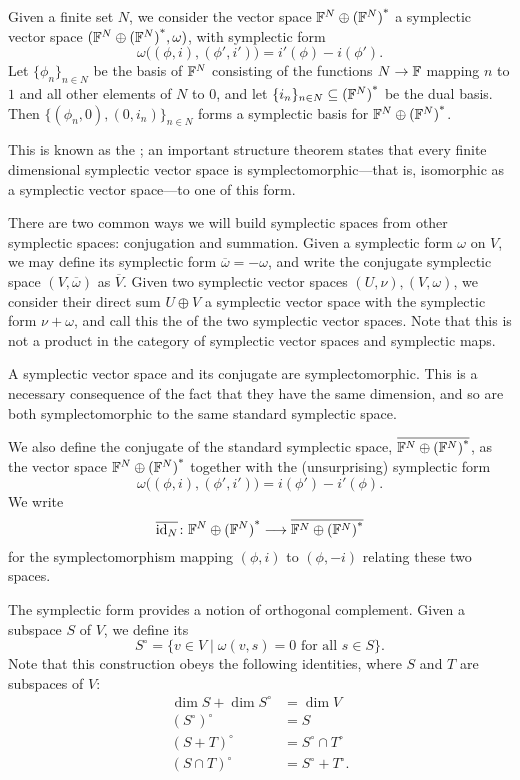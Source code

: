 \begin{example}
  \label{ex:symplectic_space_generated_by_set}
  Given a finite set $N$, we consider the vector space ${{\mathbb F}^{N} \oplus {({\mathbb F}^{N})}^\ast}$ a symplectic
  vector space $({{\mathbb F}^{N} \oplus {({\mathbb F}^{N})}^\ast},\omega)$, with symplectic form 
  \[
    \omega\big((\phi,i),(\phi',i')\big) = i'(\phi)-i(\phi').  
  \] 
  Let $\{\phi_n\}_{n \in N}$ be the basis of ${\mathbb F}^N$ consisting of the functions
  $N \to {\mathbb F}$ mapping $n$ to $1$ and all other elements of $N$ to $0$, and let
  $\{i_n\}_{n \in N} \subseteq {({\mathbb F}^N)}^\ast$ be the dual basis. Then
  $\{(\phi_n,0),(0,i_n)\}_{n\in N}$ forms a symplectic basis for ${{\mathbb F}^{N} \oplus {({\mathbb F}^{N})}^\ast}$.  

  This is known as the ; an important
  structure theorem states that every finite dimensional symplectic vector space
  is symplectomorphic---that is, isomorphic as a symplectic vector space---to
  one of this form. 
\end{example}

There are two common ways we will build symplectic spaces from other symplectic
spaces: conjugation and summation. Given a symplectic form $\omega$ on $V$, we
may define its  symplectic form $\overline\omega = - \omega$,
and write the conjugate symplectic space $(V,\overline\omega)$ as $\overline V$.
Given two symplectic vector spaces $(U, \nu),(V,\omega)$, we consider their
direct sum $U \oplus V$ a symplectic vector space with the symplectic form
$\nu+\omega$, and call this the  of the two symplectic vector
spaces. Note that this is not a product in the category of symplectic vector
spaces and symplectic maps.

\begin{example}
  \label{ex:symplectomorphisms}
  A symplectic vector space and its conjugate are symplectomorphic. This is a
  necessary consequence of the fact that they have the same dimension, and so
  are both symplectomorphic to the same standard symplectic space. 
  
  We also define the conjugate of the standard symplectic space,
  $\overline{{{\mathbb F}^{N} \oplus {({\mathbb F}^{N})}^\ast}}$, as the vector space ${{\mathbb F}^{N} \oplus {({\mathbb F}^{N})}^\ast}$ together with the
  (unsurprising) symplectic form
  \[
    \omega\big((\phi,i),(\phi',i')\big) = i(\phi')-i'(\phi).  
  \] 
  We write 
  \[
    \overline{\mathrm{id}_N}{\colon} {{\mathbb F}^{N} \oplus {({\mathbb F}^{N})}^\ast} \longrightarrow \overline{{{\mathbb F}^{N} \oplus {({\mathbb F}^{N})}^\ast}}
  \]
  for the symplectomorphism mapping $(\phi,i)$ to $(\phi,-i)$ relating these two
  spaces.
\end{example}

The symplectic form provides a notion of orthogonal complement.  Given a subspace $S$ of $V$, we define its 
\[
  S^\circ = \{v \in V \mid \omega(v,s) = 0 \textrm{ for all } s \in S\}.
\]
Note that this construction obeys the following identities, where $S$ and $T$
are subspaces of $V$:
\begin{align*}
  \dim S+ \dim S^\circ &= \dim V \\
  (S^\circ)^\circ &= S \\
  (S + T)^\circ &= S^\circ \cap T^\circ \\
  (S \cap T)^\circ &= S^\circ + T^\circ.
\end{align*}

